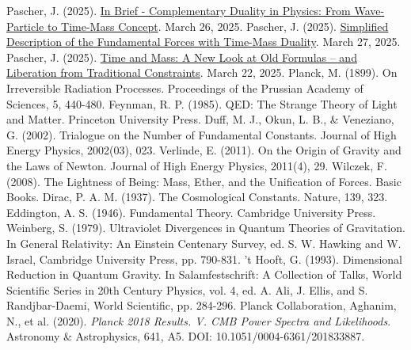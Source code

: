 \documentclass[12pt,a4paper]{article}
\begin{document}
\begin{thebibliography}{99}
		 Pascher, J. (2025). \href{https://github.com/jpascher/T0-Time-Mass-Duality/tree/main/2/pdf/English/Kurzgefasst\%20-\%20Komplementärer\%20Dualismus\%20in\%20der\%20Physik\%20-\%20Von\%20Welle-Teilchen\%20zum\%20Zeit-Masse-Konzept_en.pdf}{In Brief - Complementary Duality in Physics: From Wave-Particle to Time-Mass Concept}. March 26, 2025.
		 Pascher, J. (2025). \href{https://github.com/jpascher/T0-Time-Mass-Duality/tree/main/2/pdf/English/Vereinfachte\%20Beschreibung\%20der\%20vier\%20Grundkräfte\%20mit\%20Zeit-Masse-Dualität_en.pdf}{Simplified Description of the Fundamental Forces with Time-Mass Duality}. March 27, 2025.
		 Pascher, J. (2025). \href{https://github.com/jpascher/T0-Time-Mass-Duality/tree/main/2/pdf/English/Zeit\%20und\%20Masse\%20Ein\%20neuer\%20Blick\%20auf\%20alte\%20Formeln\%20–\%20und\%20die\%20Befreiung\%20von\%20traditionellen\%20Fesseln_en.pdf}{Time and Mass: A New Look at Old Formulas – and Liberation from Traditional Constraints}. March 22, 2025.
		 Planck, M. (1899). On Irreversible Radiation Processes. Proceedings of the Prussian Academy of Sciences, 5, 440-480.
		 Feynman, R. P. (1985). QED: The Strange Theory of Light and Matter. Princeton University Press.
		 Duff, M. J., Okun, L. B., \& Veneziano, G. (2002). Trialogue on the Number of Fundamental Constants. Journal of High Energy Physics, 2002(03), 023.
		 Verlinde, E. (2011). On the Origin of Gravity and the Laws of Newton. Journal of High Energy Physics, 2011(4), 29.
		 Wilczek, F. (2008). The Lightness of Being: Mass, Ether, and the Unification of Forces. Basic Books.
		 Dirac, P. A. M. (1937). The Cosmological Constants. Nature, 139, 323.
		 Eddington, A. S. (1946). Fundamental Theory. Cambridge University Press.
		 Weinberg, S. (1979). Ultraviolet Divergences in Quantum Theories of Gravitation. In General Relativity: An Einstein Centenary Survey, ed. S. W. Hawking and W. Israel, Cambridge University Press, pp. 790-831.
		 't Hooft, G. (1993). Dimensional Reduction in Quantum Gravity. In Salamfestschrift: A Collection of Talks, World Scientific Series in 20th Century Physics, vol. 4, ed. A. Ali, J. Ellis, and S. Randjbar-Daemi, World Scientific, pp. 284-296.
		 Planck Collaboration, Aghanim, N., et al. (2020). \textit{Planck 2018 Results. V. CMB Power Spectra and Likelihoods}. Astronomy \& Astrophysics, 641, A5. DOI: 10.1051/0004-6361/201833887.

\end{thebibliography}
\end{document}
